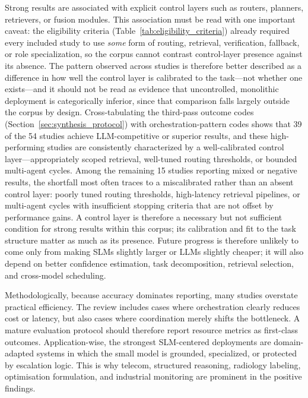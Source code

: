 Strong results are associated with explicit control layers such as routers, planners, retrievers, or fusion modules. This association must be read with one important caveat: the eligibility criteria (Table~\ref{tab:eligibility_criteria}) already required every included study to use \emph{some} form of routing, retrieval, verification, fallback, or role specialization, so the corpus cannot contrast control-layer presence against its absence. The pattern observed across studies is therefore better described as a difference in how well the control layer is calibrated to the task---not whether one exists---and it should not be read as evidence that uncontrolled, monolithic deployment is categorically inferior, since that comparison falls largely outside the corpus by design. Cross-tabulating the third-pass outcome codes (Section~\ref{sec:synthesis_protocol}) with orchestration-pattern codes shows that 39 of the 54 studies achieve LLM-competitive or superior results, and these high-performing studies are consistently characterized by a well-calibrated control layer---appropriately scoped retrieval, well-tuned routing thresholds, or bounded multi-agent cycles. Among the remaining 15 studies reporting mixed or negative results, the shortfall most often traces to a miscalibrated rather than an absent control layer: poorly tuned routing thresholds, high-latency retrieval pipelines, or multi-agent cycles with insufficient stopping criteria that are not offset by performance gains. A control layer is therefore a necessary but not sufficient condition for strong results within this corpus; its calibration and fit to the task structure matter as much as its presence. Future progress is therefore unlikely to come only from making SLMs slightly larger or LLMs slightly cheaper; it will also depend on better confidence estimation, task decomposition, retrieval selection, and cross-model scheduling.

Methodologically, because accuracy dominates reporting, many studies overstate practical efficiency. The review includes cases where orchestration clearly reduces cost or latency, but also cases where coordination merely shifts the bottleneck. A mature evaluation protocol should therefore report resource metrics as first-class outcomes. Application-wise, the strongest SLM-centered deployments are domain-adapted systems in which the small model is grounded, specialized, or protected by escalation logic. This is why telecom, structured reasoning, radiology labeling, optimisation formulation, and industrial monitoring are prominent in the positive findings.

